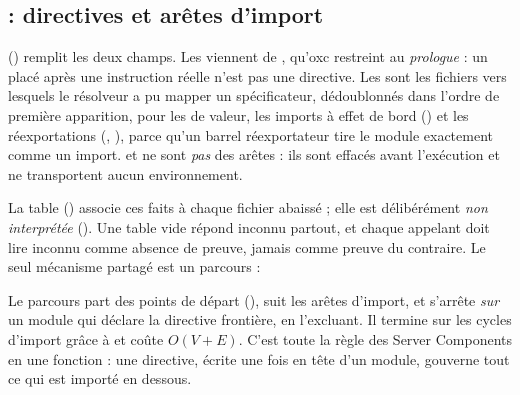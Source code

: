 \subsection{ : directives et arêtes d'import}


 () remplit les deux champs. Les  viennent de , qu'oxc restreint au \emph{prologue} : un  placé après une instruction réelle n'est pas une directive. Les  sont les fichiers vers lesquels le résolveur a pu mapper un spécificateur, dédoublonnés dans l'ordre de première apparition, pour les  de valeur, les imports à effet de bord () et les réexportations (, ), parce qu'un barrel réexportateur tire le module exactement comme un import.  et  ne sont \emph{pas} des arêtes : ils sont effacés avant l'exécution et ne transportent aucun environnement.

La table  () associe ces faits à chaque fichier abaissé ; elle est délibérément \emph{non interprétée} (). Une table vide répond \og inconnu\fg{} partout, et chaque appelant doit lire \og inconnu\fg{} comme absence de preuve, jamais comme preuve du contraire. Le seul mécanisme partagé est un parcours :


Le parcours part des points de départ (), suit les arêtes d'import, et s'arrête \emph{sur} un module qui déclare la directive frontière, en l'excluant. Il termine sur les cycles d'import grâce à  et coûte $O(V+E)$. C'est toute la règle des Server Components en une fonction : une directive, écrite une fois en tête d'un module, gouverne tout ce qui est importé en dessous.

